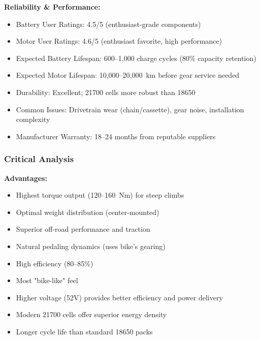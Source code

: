 \documentclass[12pt,a4paper]{article}
\begin{document}
\textbf{Reliability \& Performance:}
\begin{itemize}
    \item Battery User Ratings: 4.5/5 (enthusiast-grade components) \cite{aliexpress-batteries, amazon-components}
    \item Motor User Ratings: 4.6/5 (enthusiast favorite, high performance) \cite{endless-sphere, ebike-review}
    \item Expected Battery Lifespan: 600--1,000 charge cycles (80\% capacity retention)
    \item Expected Motor Lifespan: 10,000--20,000~km before gear service needed
    \item Durability: Excellent; 21700 cells more robust than 18650
    \item Common Issues: Drivetrain wear (chain/cassette), gear noise, installation complexity
    \item Manufacturer Warranty: 18--24 months from reputable suppliers
\end{itemize}

\subsubsection{Critical Analysis}

\textbf{Advantages:}
\begin{itemize}
    \item Highest torque output (120--160~Nm) for steep climbs
    \item Optimal weight distribution (center-mounted)
    \item Superior off-road performance and traction
    \item Natural pedaling dynamics (uses bike's gearing)
    \item High efficiency (80--85\%)
    \item Most "bike-like" feel
    \item Higher voltage (52V) provides better efficiency and power delivery
    \item Modern 21700 cells offer superior energy density
    \item Longer cycle life than standard 18650 packs
\end{itemize}
\end{document}
